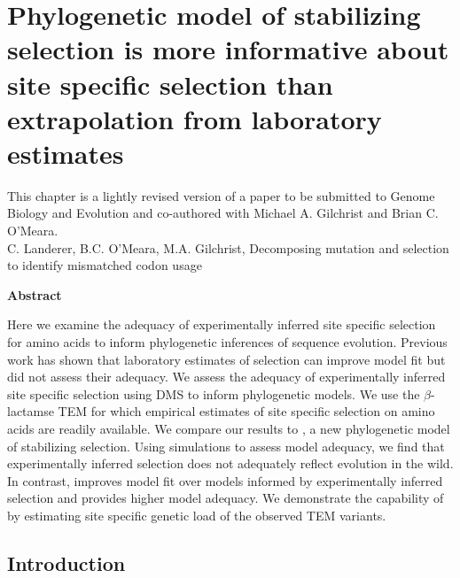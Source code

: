 \chapter{Phylogenetic model of stabilizing selection is more informative about site specific selection than extrapolation from laboratory estimates} 
\label{ch:phylogeny}

This chapter is a lightly revised version of a paper to be submitted to Genome Biology and Evolution and co-authored with Michael A. Gilchrist and Brian C. O'Meara.\\
\newline
\newline
C. Landerer, B.C. O'Meara, M.A. Gilchrist, Decomposing mutation and selection to identify mismatched codon usage

\clearpage
\pagebreak


\begin{center}\textbf{Abstract}\end{center}
Here we examine the adequacy of experimentally inferred site specific selection for amino acids to inform phylogenetic inferences of sequence evolution.
Previous work has shown that laboratory estimates of selection can improve model fit but did not assess their adequacy.
We assess the adequacy of experimentally inferred site specific selection using DMS to inform phylogenetic models.
We use the $\beta$-lactamse TEM for which empirical estimates of site specific selection on amino acids are readily available.
We compare our results to \selac, a new phylogenetic model of stabilizing selection.
Using simulations to assess model adequacy, we find that experimentally inferred selection does not adequately reflect evolution in the wild.
In contrast, \selac improves model fit over models informed by experimentally inferred selection and provides higher model adequacy.
We demonstrate the capability of \selac by estimating site specific genetic load of the observed TEM variants.

\newpage

\section{Introduction}

